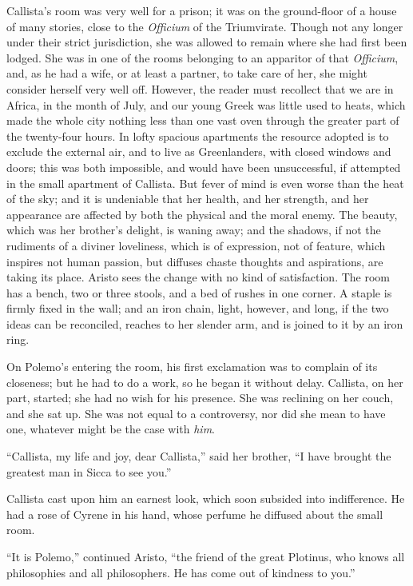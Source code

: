 Callista's room was very well for a prison; it was on the
ground-floor of a house of many stories, close to the \emph{Officium}
of the Triumvirate. Though not any longer under their strict
jurisdiction, she was allowed to remain where she had first been
lodged. She was in one of the rooms belonging to an apparitor of that \emph{Officium},
and, as he had a wife, or at least a partner, to take care of her, she
might consider herself very well off. However, the reader must
recollect that we are in Africa, in the month of July, and our young
Greek was little used to heats, which made the whole city nothing less
than one vast oven through the greater part of the twenty-four hours.
In lofty spacious apartments the resource adopted is to exclude the
external air, and to live as Greenlanders, with closed windows and
doors; this was both impossible, and would have been unsuccessful, if
attempted in the small apartment of Callista. But fever of mind is
even worse than the heat of the sky; and it is undeniable that her
health, and her strength, and her appearance are affected by both the
physical and the moral enemy. The beauty, which was her brother's
delight, is waning away; and the shadows, if not the rudiments of a
diviner loveliness, which is of expression, not of feature, which
inspires not human passion, but diffuses chaste thoughts and
aspirations, are taking its place. Aristo sees the change with no kind
of satisfaction. The room has a bench, two or three stools, and a bed
of rushes in one corner. A staple is firmly fixed in the wall; and an
iron chain, light, however, and long, if the two ideas can be
reconciled, reaches to her slender arm, and is joined to it by an iron
ring.

On Polemo's entering the room, his first exclamation was to
complain of its closeness; but he had to do a work, so he began it
without delay. Callista, on her part, started; she had no wish for his
presence. She was reclining on her couch, and she sat up. She was not
equal to a controversy, nor did she mean to have one, whatever might
be the case with \emph{him}.

``Callista, my life and joy, dear Callista,'' said her
brother, ``I have brought the greatest man in Sicca to see
you.''

Callista cast upon him an earnest look, which soon subsided into
indifference. He had a rose of Cyrene in his hand, whose perfume he
diffused about the small room.

``It is Polemo,'' continued Aristo, ``the friend of the
great Plotinus, who knows all philosophies and all philosophers. He
has come out of kindness to you.''

